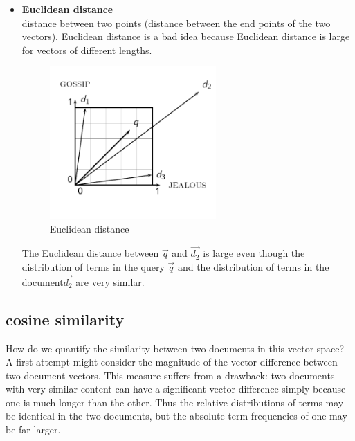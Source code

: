 \begin{itemize}
     \item \textbf{Euclidean distance}\\
     distance between two points (distance between the end points of the two vectors). 
     Euclidean distance is a bad idea because Euclidean distance is large for vectors of different lengths.
     
     
\begin{figure}[H]%
    \center%
    \includegraphics[width=0.6\textwidth]{images/shimaa/Euclidean distance.png}
    \caption[ Euclidean distance]{Euclidean distance}\label{fig:Euclidean distance}%
   \end{figure}

   The Euclidean distance between $\vec{q}$ and $\vec{d_2}$  is large even though the distribution of terms in the query $\vec{q}$ and the distribution of terms in the document$\vec{d_2}$ are very similar.  
  
\end{itemize}   

\subsection{cosine similarity}

How do we quantify the similarity between two documents in this vector
space? A first attempt might consider the magnitude of the vector difference
between two document vectors.
This measure suffers from a drawback: two documents with very similar content can have a significant vector difference simply because one is much longer than the other. Thus the relative distributions of terms may be identical in the two documents, but the absolute term frequencies of one may be far larger.

